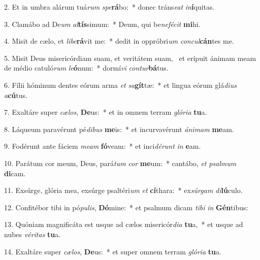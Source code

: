 2. Et in umbra alárum tuá\textit{rum} \textit{spe}\textbf{rá}bo:~*  donec tráns\textit{e}\textit{at} \textit{in}\textbf{í}quitas.\

3. Clamábo ad De\textit{um} \textit{al}\textbf{tís}simum:~*  Deum, qui be\textit{ne}\textit{fé}\textit{cit} \textbf{mi}hi.\

4. Misit de cælo, et \textit{li}\textit{be}\textbf{rá}vit me:~*  dedit in oppróbri\textit{um} \textit{con}\textit{cul}\textbf{cán}tes me.\

5. Misit Deus misericórdiam suam, et veritátem suam, \dag\  et erípuit ánimam meam de médio catuló\textit{rum} \textit{le}\textbf{ó}num:~*  dormí\textit{vi} \textit{con}\textit{tur}\textbf{bá}tus.\

6. Fílii hóminum dentes eórum arma \textit{et} \textit{sa}\textbf{gít}tæ:~*  et lingua eórum glá\textit{di}\textit{us} \textit{a}\textbf{cú}tus.\

7. Exaltáre super \textit{cæ}\textit{los}, \textbf{De}us:~*  et in omnem terram \textit{gló}\textit{ri}\textit{a} \textbf{tu}a.\

8. Láqueum paravérunt pé\textit{di}\textit{bus} \textbf{me}is:~*  et incurvavérunt \textit{á}\textit{ni}\textit{mam} \textbf{me}am.\

9. Fodérunt ante fáciem \textit{me}\textit{am} \textbf{fó}veam:~*  et inci\textit{dé}\textit{runt} \textit{in} \textbf{e}am.\

10. Parátum cor meum, Deus, pará\textit{tum} \textit{cor} \textbf{me}um:~*  cantábo, \textit{et} \textit{psal}\textit{mum} \textbf{di}cam.\

11. Exsúrge, glória mea, exsúrge psaltéri\textit{um} \textit{et} \textbf{cí}thara:~*  ex\textit{súr}\textit{gam} \textit{di}\textbf{lú}culo.\

12. Confitébor tibi in pó\textit{pu}\textit{lis}, \textbf{Dó}mine:~*  et psalmum dicam \textit{ti}\textit{bi} \textit{in} \textbf{Gén}tibus:\

13. Quóniam magnificáta est usque ad cælos misericór\textit{di}\textit{a} \textbf{tu}a,~*  et usque ad nubes \textit{vé}\textit{ri}\textit{tas} \textbf{tu}a.\

14. Exaltáre super \textit{cæ}\textit{los}, \textbf{De}us:~*  et super omnem terram \textit{gló}\textit{ri}\textit{a} \textbf{tu}a.\


